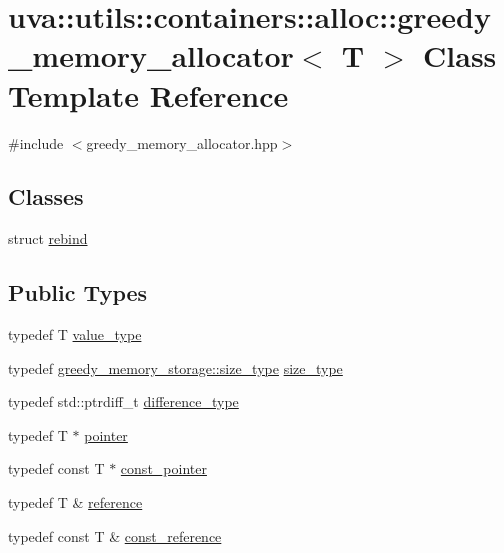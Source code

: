 \hypertarget{classuva_1_1utils_1_1containers_1_1alloc_1_1greedy__memory__allocator}{}\section{uva\+:\+:utils\+:\+:containers\+:\+:alloc\+:\+:greedy\+\_\+memory\+\_\+allocator$<$ T $>$ Class Template Reference}
\label{classuva_1_1utils_1_1containers_1_1alloc_1_1greedy__memory__allocator}


{\ttfamily \#include $<$greedy\+\_\+memory\+\_\+allocator.\+hpp$>$}

\subsection*{Classes}
\begin{DoxyCompactItemize}
\item 
struct \hyperlink{structuva_1_1utils_1_1containers_1_1alloc_1_1greedy__memory__allocator_1_1rebind}{rebind}
\end{DoxyCompactItemize}
\subsection*{Public Types}
\begin{DoxyCompactItemize}
\item 
typedef T \hyperlink{classuva_1_1utils_1_1containers_1_1alloc_1_1greedy__memory__allocator_ac78c8250061132b6335979203927a86d}{value\+\_\+type}
\item 
typedef \hyperlink{classuva_1_1utils_1_1containers_1_1greedy__memory__storage_a50b3509335bfab9e81ac0ec31b3a21ca}{greedy\+\_\+memory\+\_\+storage\+::size\+\_\+type} \hyperlink{classuva_1_1utils_1_1containers_1_1alloc_1_1greedy__memory__allocator_ab568409292e278990b1df650cebee6ec}{size\+\_\+type}
\item 
typedef std\+::ptrdiff\+\_\+t \hyperlink{classuva_1_1utils_1_1containers_1_1alloc_1_1greedy__memory__allocator_ad87f3eb0265e42524ed5c4d1d8cff6b7}{difference\+\_\+type}
\item 
typedef T $\ast$ \hyperlink{classuva_1_1utils_1_1containers_1_1alloc_1_1greedy__memory__allocator_a94dedfba2d38dbe2bec50f6eb95b98eb}{pointer}
\item 
typedef const T $\ast$ \hyperlink{classuva_1_1utils_1_1containers_1_1alloc_1_1greedy__memory__allocator_afa247377962d665cc91b5d761cb923c4}{const\+\_\+pointer}
\item 
typedef T \& \hyperlink{classuva_1_1utils_1_1containers_1_1alloc_1_1greedy__memory__allocator_a4dd90bdc76e5190311eb25acb6bb71a9}{reference}
\item 
typedef const T \& \hyperlink{classuva_1_1utils_1_1containers_1_1alloc_1_1greedy__memory__allocator_aaff0778ffef1cc6b18f8135ec663fe14}{const\+\_\+reference}
\end{DoxyCompactItemize}
